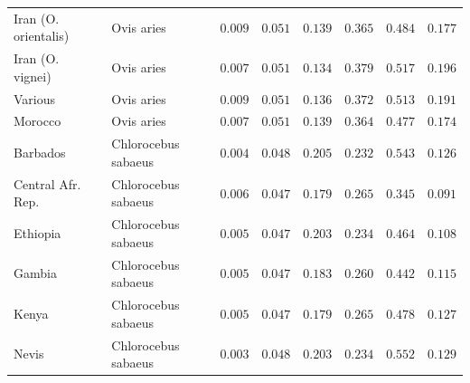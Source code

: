 \documentclass{article}
\begin{document}
\begin{center}
\begin{longtable*}{|l|l|r|r|r|r|r|r|}
            Iran (O. orientalis) &          Ovis aries &               $ 0.009$ &             $ 0.051$ &              $ 0.139$ &                                     $ 0.365$ &                       $ 0.484$ &                 $ 0.177$ \\
            Iran (O. vignei) &          Ovis aries &               $ 0.007$ &             $ 0.051$ &              $ 0.134$ &                                     $ 0.379$ &                       $ 0.517$ &                 $ 0.196$ \\
            Various &          Ovis aries &               $ 0.009$ &             $ 0.051$ &              $ 0.136$ &                                     $ 0.372$ &                       $ 0.513$ &                 $ 0.191$ \\
            Morocco &          Ovis aries &               $ 0.007$ &             $ 0.051$ &              $ 0.139$ &                                     $ 0.364$ &                       $ 0.477$ &                 $ 0.174$ \\
            Barbados & Chlorocebus sabaeus &               $ 0.004$ &             $ 0.048$ &              $ 0.205$ &                                     $ 0.232$ &                       $ 0.543$ &                 $ 0.126$ \\
            Central Afr. Rep. & Chlorocebus sabaeus &               $ 0.006$ &             $ 0.047$ &              $ 0.179$ &                                     $ 0.265$ &                       $ 0.345$ &                 $ 0.091$ \\
            Ethiopia & Chlorocebus sabaeus &               $ 0.005$ &             $ 0.047$ &              $ 0.203$ &                                     $ 0.234$ &                       $ 0.464$ &                 $ 0.108$ \\
            Gambia & Chlorocebus sabaeus &               $ 0.005$ &             $ 0.047$ &              $ 0.183$ &                                     $ 0.260$ &                       $ 0.442$ &                 $ 0.115$ \\
            Kenya & Chlorocebus sabaeus &               $ 0.005$ &             $ 0.047$ &              $ 0.179$ &                                     $ 0.265$ &                       $ 0.478$ &                 $ 0.127$ \\
            Nevis & Chlorocebus sabaeus &               $ 0.003$ &             $ 0.048$ &              $ 0.203$ &                                     $ 0.234$ &                       $ 0.552$ &                 $ 0.129$ \\

\end{longtable*}
\end{center}
\end{document}
